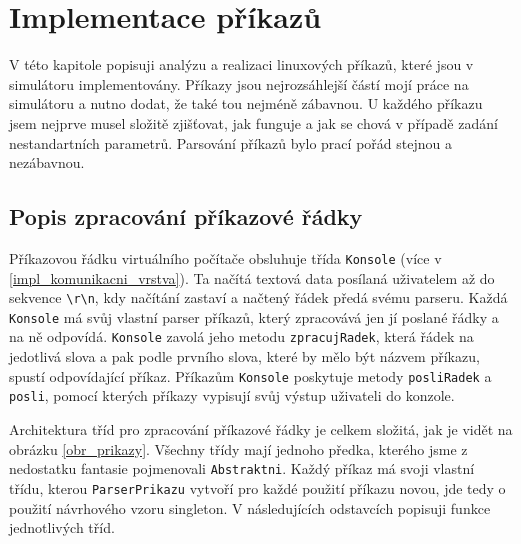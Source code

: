 
\chapter{Implementace příkazů}

V této kapitole popisuji analýzu a realizaci linuxových příkazů, které jsou v simulátoru implementovány. Příkazy jsou nejrozsáhlejší částí mojí práce na simulátoru a nutno dodat, že také tou nejméně zábavnou. U každého příkazu jsem nejprve musel složitě zjišťovat, jak funguje a jak se chová v případě zadání nestandartních parametrů. Parsování příkazů bylo prací pořád stejnou a nezábavnou. 





\section{Popis zpracování příkazové řádky}

Příkazovou řádku virtuálního počítače obsluhuje třída \verb|Konsole| (více v \ref{impl_komunikacni_vrstva}). Ta načítá textová data posílaná uživatelem až do sekvence \verb|\r\n|, kdy načítání zastaví a načtený řádek předá svému parseru. Každá \verb|Konsole| má svůj vlastní parser příkazů, který zpracovává jen jí poslané řádky a na ně odpovídá. \verb|Konsole| zavolá jeho metodu \verb|zpracujRadek|, která řádek  na jedotlivá slova a pak podle prvního slova, které by mělo být názvem příkazu, spustí odpovídající příkaz. Příkazům \verb|Konsole| poskytuje metody \verb|posliRadek| a \verb|posli|, pomocí kterých příkazy vypisují svůj výstup uživateli do konzole.

Architektura tříd pro zpracování příkazové řádky je celkem složitá, jak je vidět na obrázku \ref{obr_prikazy}. Všechny třídy mají jednoho předka, kterého jsme z nedostatku fantasie pojmenovali \verb|Abstraktni|. Každý příkaz má svoji vlastní třídu, kterou \verb|ParserPrikazu| vytvoří pro každé použití příkazu novou, jde tedy o použití návrhového vzoru singleton. V následujících odstavcích popisuji funkce jednotlivých tříd.

